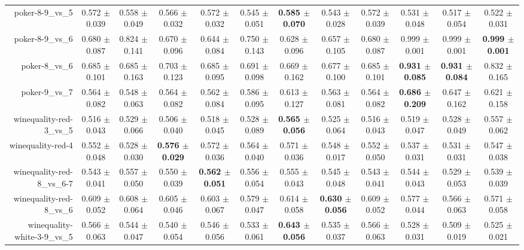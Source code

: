 \begin{table}[!ht]
{\begin{tabular}{r c c c c c c c c c c c}
poker-8-9\_vs\_5 & 0.572 $\pm$ 0.039 & 0.558 $\pm$ 0.049 & 0.566 $\pm$ 0.032 & 0.572 $\pm$ 0.032 & 0.545 $\pm$ 0.051 & \textbf{0.585 $\pm$ 0.070} & 0.543 $\pm$ 0.028 & 0.572 $\pm$ 0.039 & 0.531 $\pm$ 0.048 & 0.517 $\pm$ 0.054 & 0.522 $\pm$ 0.031 \\
poker-8-9\_vs\_6 & 0.680 $\pm$ 0.087 & 0.824 $\pm$ 0.141 & 0.670 $\pm$ 0.096 & 0.644 $\pm$ 0.084 & 0.750 $\pm$ 0.143 & 0.628 $\pm$ 0.096 & 0.657 $\pm$ 0.105 & 0.680 $\pm$ 0.087 & 0.999 $\pm$ 0.001 & 0.999 $\pm$ 0.001 & \textbf{0.999 $\pm$ 0.001} \\
poker-8\_vs\_6 & 0.685 $\pm$ 0.101 & 0.685 $\pm$ 0.163 & 0.703 $\pm$ 0.123 & 0.685 $\pm$ 0.095 & 0.691 $\pm$ 0.098 & 0.669 $\pm$ 0.162 & 0.677 $\pm$ 0.100 & 0.685 $\pm$ 0.101 & \textbf{0.931 $\pm$ 0.085} & \textbf{0.931 $\pm$ 0.084} & 0.832 $\pm$ 0.165 \\
poker-9\_vs\_7 & 0.564 $\pm$ 0.082 & 0.548 $\pm$ 0.063 & 0.564 $\pm$ 0.082 & 0.562 $\pm$ 0.084 & 0.586 $\pm$ 0.095 & 0.613 $\pm$ 0.127 & 0.563 $\pm$ 0.081 & 0.564 $\pm$ 0.082 & \textbf{0.686 $\pm$ 0.209} & 0.647 $\pm$ 0.162 & 0.621 $\pm$ 0.158 \\
winequality-red-3\_vs\_5 & 0.516 $\pm$ 0.043 & 0.529 $\pm$ 0.066 & 0.506 $\pm$ 0.040 & 0.518 $\pm$ 0.045 & 0.528 $\pm$ 0.089 & \textbf{0.565 $\pm$ 0.056} & 0.525 $\pm$ 0.064 & 0.516 $\pm$ 0.043 & 0.519 $\pm$ 0.047 & 0.528 $\pm$ 0.049 & 0.557 $\pm$ 0.062 \\
winequality-red-4 & 0.552 $\pm$ 0.048 & 0.528 $\pm$ 0.030 & \textbf{0.576 $\pm$ 0.029} & 0.572 $\pm$ 0.036 & 0.564 $\pm$ 0.040 & 0.571 $\pm$ 0.036 & 0.548 $\pm$ 0.017 & 0.552 $\pm$ 0.050 & 0.537 $\pm$ 0.031 & 0.531 $\pm$ 0.031 & 0.547 $\pm$ 0.038 \\
winequality-red-8\_vs\_6-7 & 0.543 $\pm$ 0.041 & 0.557 $\pm$ 0.050 & 0.550 $\pm$ 0.039 & \textbf{0.562 $\pm$ 0.051} & 0.556 $\pm$ 0.054 & 0.555 $\pm$ 0.043 & 0.545 $\pm$ 0.048 & 0.543 $\pm$ 0.041 & 0.544 $\pm$ 0.043 & 0.529 $\pm$ 0.053 & 0.539 $\pm$ 0.039 \\
winequality-red-8\_vs\_6 & 0.609 $\pm$ 0.052 & 0.608 $\pm$ 0.064 & 0.605 $\pm$ 0.046 & 0.603 $\pm$ 0.067 & 0.579 $\pm$ 0.047 & 0.614 $\pm$ 0.058 & \textbf{0.630 $\pm$ 0.056} & 0.609 $\pm$ 0.052 & 0.577 $\pm$ 0.044 & 0.566 $\pm$ 0.063 & 0.571 $\pm$ 0.058 \\
winequality-white-3-9\_vs\_5 & 0.566 $\pm$ 0.063 & 0.544 $\pm$ 0.047 & 0.540 $\pm$ 0.054 & 0.546 $\pm$ 0.056 & 0.533 $\pm$ 0.061 & \textbf{0.643 $\pm$ 0.056} & 0.535 $\pm$ 0.037 & 0.566 $\pm$ 0.063 & 0.528 $\pm$ 0.031 & 0.509 $\pm$ 0.019 & 0.525 $\pm$ 0.021 \\

\end{tabular}}
\end{table}
